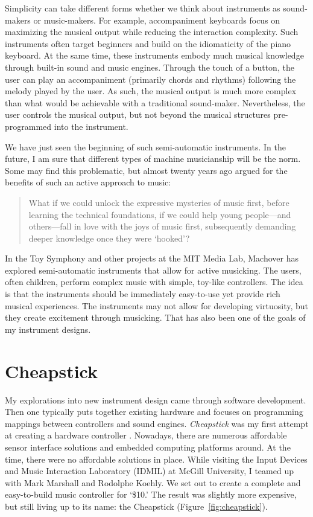Simplicity can take different forms whether we think about instruments as sound-makers or music-makers. For example, accompaniment keyboards focus on maximizing the musical output while reducing the interaction complexity. Such instruments often target beginners and build on the idiomaticity of the piano keyboard. At the same time, these instruments embody much musical knowledge through built-in sound and music engines. Through the touch of a button, the user can play an accompaniment (primarily chords and rhythms) following the melody played by the user. As such, the musical output is much more complex than what would be achievable with a traditional sound-maker. Nevertheless, the user controls the musical output, but not beyond the musical structures pre-programmed into the instrument.

We have just seen the beginning of such semi-automatic instruments. In the future, I am sure that different types of machine musicianship will be the norm.
Some may find this problematic, but almost twenty years ago \citet[171]{machover_shaping_2004} argued for the benefits of such an active approach to music:

\begin{quote}
	What if we could unlock the expressive mysteries of music first, before learning the technical foundations, if we could help young people---and others---fall in love with the joys of music first, subsequently demanding deeper knowledge once they were `hooked'?
\end{quote}

In the Toy Symphony and other projects at the MIT Media Lab, Machover has explored semi-automatic instruments that allow for active musicking. The users, often children, perform complex music with simple, toy-like controllers. The idea is that the instruments should be immediately easy-to-use yet provide rich musical experiences. The instruments may not allow for developing virtuosity, but they create excitement through musicking. That has also been one of the goals of my instrument designs.


\section{Cheapstick}\label{sec:cheapstick}

My explorations into new instrument design came through software development. Then one typically puts together existing hardware and focuses on programming mappings between controllers and sound engines.
\emph{Cheapstick} was my first attempt at creating a hardware controller \citep{jensenius_building_2006}. Nowadays, there are numerous affordable sensor interface solutions and embedded computing platforms around. At the time, there were no affordable solutions in place. While visiting the Input Devices and Music Interaction Laboratory (IDMIL) at McGill University, I teamed up with Mark Marshall and Rodolphe Koehly. We set out to create a complete and easy-to-build music controller for `\$10.' The result was slightly more expensive, but still living up to its name: the Cheapstick (Figure~\ref{fig:cheapstick}).

